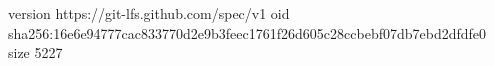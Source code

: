 version https://git-lfs.github.com/spec/v1
oid sha256:16e6e94777cac833770d2e9b3feec1761f26d605c28ccbebf07db7ebd2dfdfe0
size 5227
